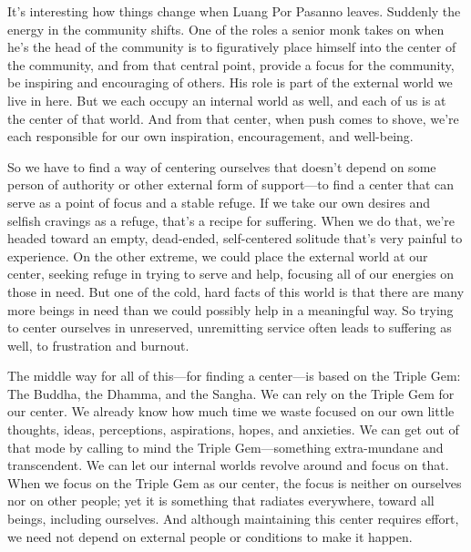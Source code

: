 
It's interesting how things change when Luang Por Pasanno leaves. 
Suddenly the energy in the community shifts. One of the roles a senior 
monk takes on when he's the head of the community is to figuratively 
place himself into the center of the community, and from that central 
point, provide a focus for the community, be inspiring and encouraging 
of others. His role is part of the external world we live in here. But 
we each occupy an internal world as well, and each of us is at the 
center of that world. And from that center, when push comes to shove, 
we're each responsible for our own inspiration, encouragement, and 
well-being.

So we have to find a way of centering ourselves that doesn't depend on 
some person of authority or other external form of support---to find a 
center that can serve as a point of focus and a stable refuge. If we 
take our own desires and selfish cravings as a refuge, that's a recipe 
for suffering. When we do that, we're headed toward an empty, 
dead-ended, self-centered solitude that's very painful to experience. 
On the other extreme, we could place the external world at our center, 
seeking refuge in trying to serve and help, focusing all of our 
energies on those in need. But one of the cold, hard facts of this 
world is that there are many more beings in need than we could possibly 
help in a meaningful way. So trying to center ourselves in unreserved, 
unremitting service often leads to suffering as well, to frustration 
and burnout.

The middle way for all of this---for finding a center---is based on the 
Triple Gem: The Buddha, the Dhamma, and the Sangha. We can rely on the 
Triple Gem for our center. We already know how much time we waste 
focused on our own little thoughts, ideas, perceptions, aspirations, 
hopes, and anxieties. We can get out of that mode by calling to mind 
the Triple Gem---something extra-mundane and transcendent. We can let 
our internal worlds revolve around and focus on that. When we focus on 
the Triple Gem as our center, the focus is neither on ourselves nor on 
other people; yet it is something that radiates everywhere, toward all 
beings, including ourselves. And although maintaining this center 
requires effort, we need not depend on external people or conditions to 
make it happen.

